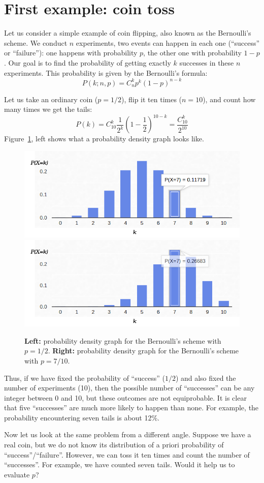 \documentclass[notitlepage]{report}
\begin{document}
\section{First example: coin toss}
Let us consider a simple example of coin flipping, also known as the Bernoulli's scheme. 
We conduct $n$ experiments, two events can happen in each one (``success'' or ``failure''): 
one happens with probability $p$, the other one with probability $1-p$. 
Our goal is to find the probability of getting exactly $k$ successes in these $n$ experiments. 
This probability is given by the Bernoulli's formula:
$$
P(k;n,p) = C_n^k p^k (1-p)^{n-k}
$$

Let us take an ordinary coin ($p=1/2$), flip it ten times ($n=10$), and count how many times we get the tails:
$$P(k) = C_{10}^k \frac{1}{2^k}\left(1-\frac{1}{2}\right)^{10-k} = \frac{C_{10}^k}{2^{10}}$$
Figure~\ref{fig:binomial}, left shows what a probability density graph looks like.

\begin{figure}[htb!]
\centering
\includegraphics[width=.48\columnwidth]{binomial-05.png}
\includegraphics[width=.48\columnwidth]{binomial-07.png}
\caption{\textbf{Left:} probability density graph for the Bernoulli's scheme with $p=1/2$. \textbf{Right:} probability density graph for the Bernoulli's scheme with $p=7/10$.}
\label{fig:binomial}
\end{figure}

Thus, if we have fixed the probability of ``success'' ($1/2$) and also fixed the number of experiments (10), 
then the possible number of ``successes'' can be any integer between 0 and 10, but these outcomes are not equiprobable. 
It is clear that five ``successes'' are much more likely to happen than none. For example, the probability encountering seven tails is about 12\%.

Now let us look at the same problem from a different angle. 
Suppose we have a real coin, but we do not know its distribution of a priori probability of ``success''/``failure''. 
However, we can toss it ten times and count the number of ``successes''. 
For example, we have counted seven tails.
Would it help us to evaluate $p$?
\end{document}
